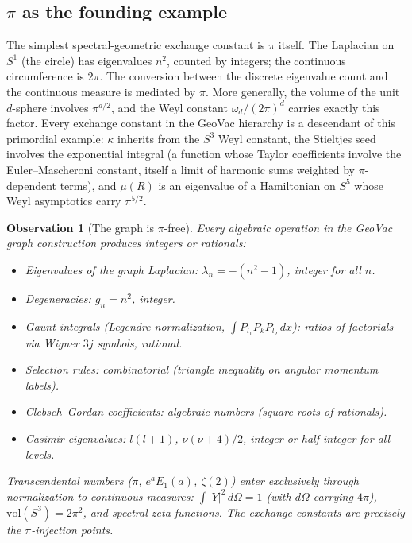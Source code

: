 \documentclass[aps,pra,twocolumn,superscriptaddress,longbibliography]{revtex4-2}
\newtheorem{observation}{Observation}
\begin{document}
\subsection{$\pi$ as the founding example}

The simplest spectral-geometric exchange constant is $\pi$ itself.
The Laplacian on $S^1$ (the circle) has eigenvalues $n^2$, counted
by integers; the continuous circumference is $2\pi$.  The
conversion between the discrete eigenvalue count and the continuous
measure is mediated by $\pi$.  More generally, the volume of the
unit $d$-sphere involves $\pi^{d/2}$, and the Weyl constant
$\omega_d / (2\pi)^d$ carries exactly this factor.  Every exchange
constant in the GeoVac hierarchy is a descendant of this primordial
example: $\kappa$ inherits from the $S^3$ Weyl constant, the
Stieltjes seed involves the exponential integral (a function whose
Taylor coefficients involve the Euler--Mascheroni constant, itself
a limit of harmonic sums weighted by $\pi$-dependent terms), and
$\mu(R)$ is an eigenvalue of a Hamiltonian on $S^5$ whose Weyl
asymptotics carry $\pi^{5/2}$.

\begin{observation}[The graph is $\pi$-free]
\label{obs:pi-free}
Every algebraic operation in the GeoVac graph construction
produces integers or rationals:
\begin{itemize}
  \item Eigenvalues of the graph Laplacian: $\lambda_n = -(n^2 - 1)$,
    integer for all $n$.
  \item Degeneracies: $g_n = n^2$, integer.
  \item Gaunt integrals (Legendre normalization,
    $\int P_{l_1} P_k P_{l_2}\,dx$): ratios of factorials via
    Wigner $3j$ symbols, rational.
  \item Selection rules: combinatorial (triangle inequality on angular
    momentum labels).
  \item Clebsch--Gordan coefficients: algebraic numbers (square roots
    of rationals).
  \item Casimir eigenvalues: $l(l+1)$, $\nu(\nu+4)/2$, integer or
    half-integer for all levels.
\end{itemize}
Transcendental numbers ($\pi$, $e^a E_1(a)$, $\zeta(2)$) enter
exclusively through normalization to continuous measures:
$\int |Y|^2\,d\Omega = 1$ (with $d\Omega$ carrying $4\pi$),
$\mathrm{vol}(S^3) = 2\pi^2$, and spectral zeta functions.
The exchange constants are precisely the $\pi$-injection points.
\end{observation}
\end{document}
